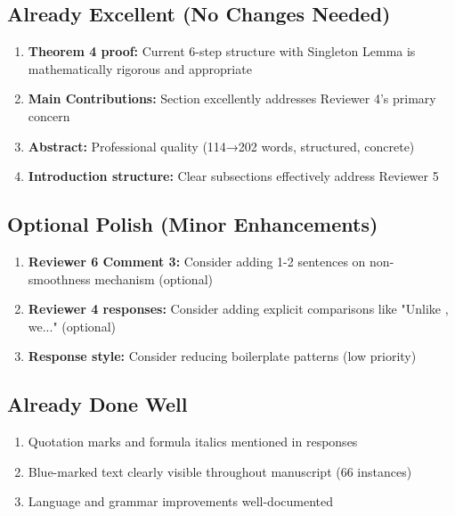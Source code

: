 \documentclass[11pt]{article}
\begin{document}
\subsection{Already Excellent (No Changes Needed)}

\begin{enumerate}
\item \textcolor{success}{\textbf{Theorem 4 proof:}} Current 6-step structure with Singleton Lemma is mathematically rigorous and appropriate
\item \textcolor{success}{\textbf{Main Contributions:}} Section excellently addresses Reviewer 4's primary concern
\item \textcolor{success}{\textbf{Abstract:}} Professional quality (114→202 words, structured, concrete)
\item \textcolor{success}{\textbf{Introduction structure:}} Clear subsections effectively address Reviewer 5
\end{enumerate}

\subsection{Optional Polish (Minor Enhancements)}

\begin{enumerate}
\item \textcolor{warning}{\textbf{Reviewer 6 Comment 3:}} Consider adding 1-2 sentences on non-smoothness mechanism (optional)
\item \textcolor{warning}{\textbf{Reviewer 4 responses:}} Consider adding explicit comparisons like "Unlike \cite{X}, we..." (optional)
\item \textbf{Response style:} Consider reducing boilerplate patterns (low priority)
\end{enumerate}

\subsection{Already Done Well}

\begin{enumerate}
\item Quotation marks and formula italics mentioned in responses
\item Blue-marked text clearly visible throughout manuscript (66 instances)
\item Language and grammar improvements well-documented
\end{enumerate}
\end{document}
